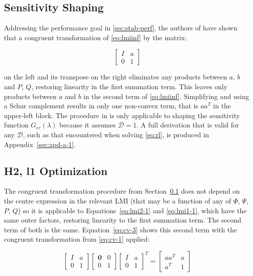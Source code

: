 \subsection{Sensitivity Shaping}
\label{sec:opt-ss}

Addressing the performance goal in \autoref{sec:stab-perf}, the authors of \cite[Th. 1]{Li2014} have shown that a congruent transformation of \autoref{eq:lmiinf} by the matrix:

\begin{equation} \label{eq:cv-1}
	\begin{bmatrix}
		I & a \\
		0 & 1
	\end{bmatrix}
\end{equation}

on the left and its transpose on the right eliminates any products between $a$, $b$ and $P$, $Q$, restoring linearity in the first summation term. This leaves only products between $a$ and $b$ in the second term of \autoref{eq:lmiinf}. Simplifying and using a Schur complement results in only one non-convex term, that is $aa^T$ in the upper-left block. The procedure in \cite{Li2014} is only applicable to shaping the sensitivity function $G_{er}(\lambda)$ because it assumes $\mathcal{D} = 1$. A full derivation that is valid for any $\mathcal{D}$, such as that encountered when solving \autoref{eq:rl}, is produced in Appendix~\ref{sec:apd-a-1}.

\subsection{\gls{H2}, \gls{l1} Optimization}
\label{sec:opt-h2l1}

The congruent transformation procedure from Section~\ref{sec:opt-ss} does not depend on the centre expression in the relevant \gls{LMI} (that may be a function of any of $\Phi$, $\Psi$, $P$, $Q$) so it is applicable to Equations~\ref{eq:lmi2-1} and \ref{eq:lmi1-1}, which have the same outer factors, restoring linearity to the first summation term. The second term of both is the same. Equation~\ref{eq:cv-3} shows this second term with the congruent transformation from \autoref{eq:cv-1} applied:

\begin{equation} \label{eq:cv-3}
	\begin{bmatrix}
		I & a \\
		0 & 1
	\end{bmatrix}
	\begin{bmatrix}
		\mathbf{0} & 0 \\
		0 & 1
	\end{bmatrix}
	\begin{bmatrix}
		I & a \\
		0 & 1
	\end{bmatrix}^T
	= 
	\begin{bmatrix}
		aa^T & a \\
		a^T & 1
	\end{bmatrix}
\end{equation}

